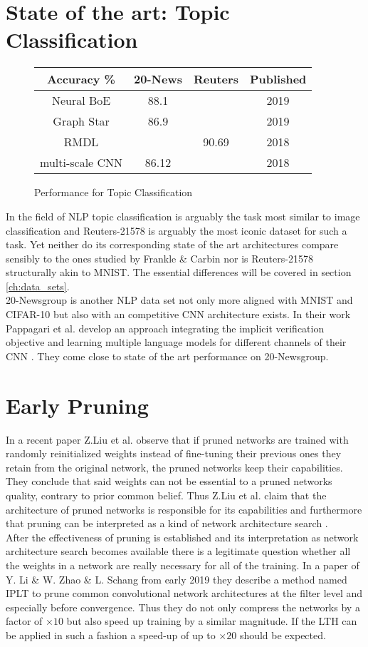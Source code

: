 \section{State of the art: Topic Classification}
\begin{figure}
	\begin{tabular}{c|c|c|c}
		Accuracy \% & 20-News & Reuters & Published\\
		\hline
		Neural BoE & 88.1 &  & 2019 \\
		Graph Star & 86.9 &  & 2019 \\
		RMDL &  & 90.69 & 2018 \\
		\hline
		multi-scale CNN & 86.12 &  & 2018 \\
		
	\end{tabular}
	\caption{Performance for Topic Classification}
\end{figure}
In the field of NLP topic classification is arguably the task most similar to image classification and Reuters-21578 is arguably the most iconic dataset for such a task. Yet neither do its corresponding state of the art architectures compare sensibly to the ones studied by Frankle \& Carbin nor is Reuters-21578 structurally akin to MNIST. The essential differences will be covered in section \ref{ch:data_sets}. \\
20-Newsgroup is another NLP data set not only more aligned with MNIST and CIFAR-10 but also with an competitive CNN architecture exists. In their work Pappagari et al. develop an approach integrating the implicit verification objective and learning multiple language models for different channels of their CNN \cite{End-to-End-CNN}. They come close to state of the art performance on 20-Newsgroup. 

\section{Early Pruning}
In a recent paper \cite{Rethinking-Network-Pruning} Z.Liu et al. observe that if pruned networks are trained with randomly reinitialized weights instead of fine-tuning their previous ones they retain from the original network, the pruned networks keep their capabilities. They conclude that said weights can not be essential to a pruned networks quality, contrary to prior common belief. Thus Z.Liu et al. claim that the architecture of pruned networks is responsible for its capabilities and furthermore that pruning can be interpreted as a kind of network architecture search .\\
After the effectiveness of pruning is established and its interpretation as network architecture search becomes available there is a legitimate question whether all the weights in a network are really necessary for all of the training. In a paper of Y. Li \& W. Zhao \& L. Schang from early 2019 \cite{Pruning-With-Little-Training} they describe a method named IPLT to prune common convolutional network architectures at the filter level and especially before convergence. Thus they do not only compress the networks by a factor of $\times10$ but also speed up training by a similar magnitude. If the LTH can be applied in such a fashion a speed-up of up to $\times20$ should be expected.

